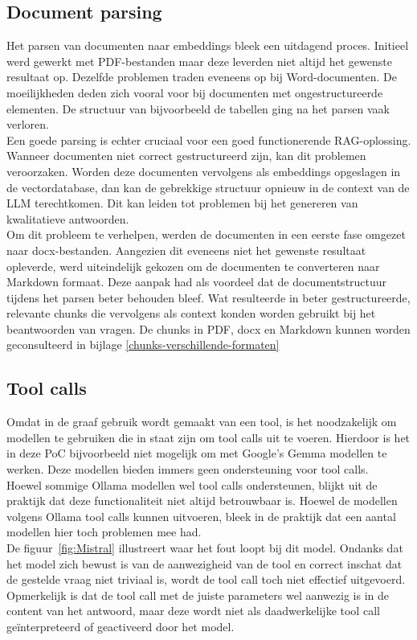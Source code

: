 \subsection{Document parsing}
Het parsen van documenten naar embeddings bleek een uitdagend proces. Initieel werd gewerkt met PDF-bestanden maar deze leverden niet altijd het gewenste resultaat op. Dezelfde problemen traden eveneens op bij Word-documenten. De moeilijkheden deden zich vooral voor bij documenten met ongestructureerde elementen. De structuur van bijvoorbeeld de tabellen ging na het parsen vaak verloren.
\\[1em]
Een goede parsing is echter cruciaal voor een goed functionerende RAG-oplossing. Wanneer documenten niet correct gestructureerd zijn, kan dit problemen veroorzaken. Worden deze documenten vervolgens als embeddings opgeslagen in de vectordatabase, dan kan de gebrekkige structuur opnieuw in de context van de LLM terechtkomen. Dit kan leiden tot problemen bij het genereren van kwalitatieve antwoorden.
\\[1em]
Om dit probleem te verhelpen, werden de documenten in een eerste fase omgezet naar docx-bestanden. Aangezien dit eveneens niet het gewenste resultaat opleverde, werd uiteindelijk gekozen om de documenten te converteren naar Markdown formaat. Deze aanpak had als voordeel dat de documentstructuur tijdens het parsen beter behouden bleef. Wat resulteerde in beter gestructureerde, relevante chunks die vervolgens als context konden worden gebruikt bij het beantwoorden van vragen. De chunks in PDF, docx en Markdown kunnen worden geconsulteerd in bijlage \ref{chunks-verschillende-formaten}

\subsection{Tool calls}
\label{tool-calls}

Omdat in de graaf gebruik wordt gemaakt van een tool, is het noodzakelijk om modellen te gebruiken die in staat zijn om tool calls uit te voeren. Hierdoor is het in deze PoC bijvoorbeeld niet mogelijk om met Google's Gemma modellen te werken. Deze modellen bieden immers geen ondersteuning voor tool calls.
\\[1em]
Hoewel sommige Ollama modellen wel tool calls ondersteunen, blijkt uit de praktijk dat deze functionaliteit niet altijd betrouwbaar is. Hoewel de modellen volgens Ollama tool calls kunnen uitvoeren, bleek in de praktijk dat een aantal modellen hier toch problemen mee had.
\\[1em]
De figuur~\ref{fig:Mistral} illustreert waar het fout loopt bij dit model. Ondanks dat het model zich bewust is van de aanwezigheid van de tool en correct inschat dat de gestelde vraag niet triviaal is, wordt de tool call toch niet effectief uitgevoerd.
\\[1em]
Opmerkelijk is dat de tool call met de juiste parameters wel aanwezig is in de content van het antwoord, maar deze wordt niet als daadwerkelijke tool call geïnterpreteerd of geactiveerd door het model.

